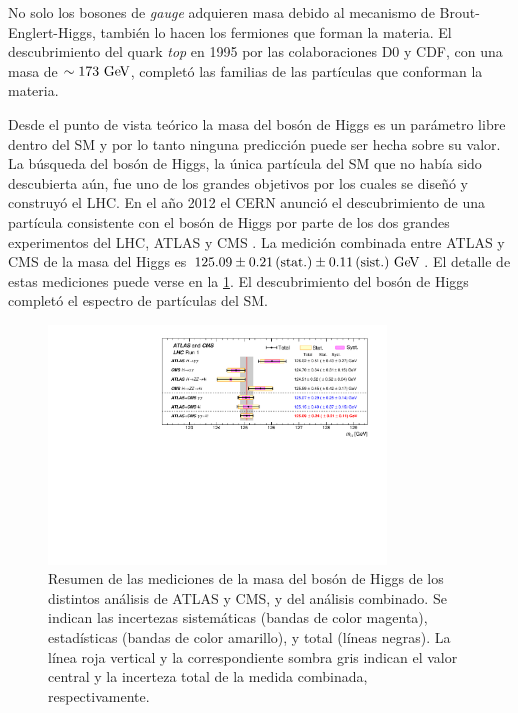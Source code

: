 No solo los bosones de \emph{gauge} adquieren masa debido al mecanismo de Brout-Englert-Higgs,
también lo hacen los fermiones que forman la materia. El descubrimiento del
quark \emph{top} en 1995 por las colaboraciones D0 y CDF, con una masa de $\sim 173
\GeV$, completó las familias de las partículas que conforman la materia.

Desde el punto de vista teórico la masa del bosón de Higgs es un parámetro libre
dentro del SM y por lo tanto ninguna predicción puede ser hecha sobre su valor. La búsqueda
del bosón de Higgs, la única partícula del SM que no había sido descubierta
aún, fue uno de los grandes objetivos por los cuales se dise\~nó y construyó el
LHC. En el a\~no 2012 el CERN anunció el
descubrimiento de una partícula consistente con el bosón de Higgs por parte de
los dos grandes experimentos del LHC, ATLAS y CMS
\cite{Aad:2012tfa,Chatrchyan:2012ufa}. La medición combinada entre ATLAS y CMS
de la masa del Higgs es $125.09 \pm 0.21\, \text{(stat.)} \pm 0.11\, \text{(sist.)}
\gev$\cite{HiggsMass_ATLAS_CMS}.
El detalle de estas mediciones  puede verse en la \cref{fig:higgs_cms_atlas}.
El descubrimiento del bosón de Higgs completó el espectro de partículas del SM.

\begin{figure}[!htbp]
  \centering
  \includegraphics[width=0.8\textwidth]{figures/higgs_atlas_cms_mass}
  \caption{Resumen de las mediciones de la masa del bosón de Higgs de los
    distintos análisis de ATLAS y CMS, y del análisis combinado. Se indican las
    incertezas sistemáticas (bandas de color magenta), estadísticas (bandas de
    color amarillo), y total (líneas negras). La línea roja vertical y la
    correspondiente sombra gris indican el valor central y la incerteza total de
    la medida combinada, respectivamente\cite{HiggsMass_ATLAS_CMS}.}
  \label{fig:higgs_cms_atlas}
\end{figure}



